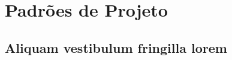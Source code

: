 \chapter{Padrões de Projeto}

\section{Aliquam vestibulum fringilla lorem}

\lipsum[1]

\lipsum[2-3]